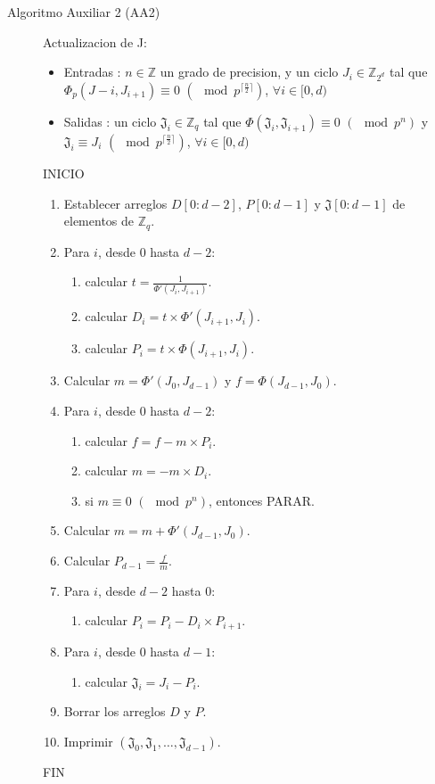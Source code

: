 \documentclass[11pt]{article}
\newcommand{\Z}{\mathbb{Z}}
\numberwithin{equation}{section} %
\numberwithin{figure}{section} %
\numberwithin{table}{section} %
\begin{document}
\begin{description}
			\item[Algoritmo Auxiliar 2 (AA2)] Actualizacion de J:%
			\begin{itemize}
				\item Entradas : $n\in\Z$ un grado de precision, y un ciclo $J_i\in\Z_{2^d}$ tal que $\Phi_p(J-i,J_{i+1})\equiv 0$ $(\mod p^{\lceil\frac{n}{2}\rceil})$, $\forall i\in[0,d)$
				\item Salidas : un ciclo $\mathfrak{J}_i\in\Z_q$ tal que $\Phi(\mathfrak{J}_i,\mathfrak{J}_{i+1})\equiv 0$ $(\mod p^n)$ y $\mathfrak{J}_i\equiv J_i$ $(\mod p^{\lceil\frac{n}{2}\rceil})$, $\forall i\in[0,d)$
			\end{itemize}
			INICIO
			\begin{enumerate}
				\item Establecer arreglos $D[0:d-2]$, $P[0:d-1]$ y $\mathfrak{J}[0:d-1]$ de elementos de $\Z_q$.
				\item Para $i$, desde $0$ hasta $d-2$:
				\begin{enumerate}
					\item calcular $t=\frac{1}{\Phi\prime(J_i,J_{i+1})}$.
					\item calcular $D_i=t\times\Phi\prime(J_{i+1},J_i)$.
					\item calcular $P_i=t\times\Phi(J_{i+1},J_i)$. 
				\end{enumerate}
				\item Calcular $m=\Phi\prime(J_{0},J_{d-1})$ y $f=\Phi(J_{d-1},J_{0})$.
				\item Para $i$, desde $0$ hasta $d-2$:
				\begin{enumerate}
					\item calcular $f=f-m\times P_i$.
					\item calcular $m=-m\times D_i$.
					\item si $m\equiv 0$ $(\mod p^n)$, entonces PARAR.
				\end{enumerate}
				\item Calcular $m=m+\Phi\prime(J_{d-1},J_0)$.
				\item Calcular $P_{d-1}=\frac{f}{m}$.
				\item Para $i$, desde $d-2$ hasta $0$:
				\begin{enumerate}
					\item calcular $P_i=P_i-D_i\times P_{i+1}$.
				\end{enumerate}
				\item Para $i$, desde $0$ hasta $d-1$:
				\begin{enumerate}
					\item calcular $\mathfrak{J}_i=J_i-P_i$.
				\end{enumerate}
				\item Borrar los arreglos $D$ y $P$.
				\item Imprimir $(\mathfrak{J}_0,\mathfrak{J}_1,\ldots,\mathfrak{J}_{d-1})$.
			\end{enumerate}
			FIN


\end{description}
\end{document}
